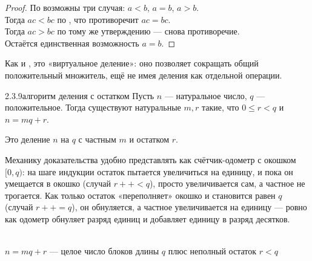 \begin{proof}
По  возможны три случая: $a<b$, $a=b$, $a>b$.\\
 Тогда $ac<bc$ по , что противоречит
$ac=bc$.\\
 Тогда $ac>bc$ по тому же утверждению — снова противоречие.\\
Остаётся единственная возможность $a=b$.
\end{proof}

\begin{remark}
Как и , это «виртуальное деление»: оно
позволяет сокращать общий положительный множитель, ещё не имея деления как отдельной
операции.
\end{remark}

\begin{proposition}{2.3.9}{алгоритм деления с остатком}
Пусть $n$ — натуральное число, $q$ — положительное. Тогда существуют натуральные $m,r$
такие, что $0 \leq r < q$ и $n=mq+r$.
\end{proposition}

\begin{remark}
Это деление $n$ на $q$ с частным $m$ и остатком $r$.
\end{remark}

\begin{intuition}
Механику доказательства удобно представлять как счётчик-одометр с окошком $[0,q)$: на шаге
индукции остаток пытается увеличиться на единицу, и пока он умещается в окошко (случай
$r{+}{+}<q$), просто увеличивается сам, а частное не трогается. Как только остаток
«переполняет» окошко и становится равен $q$ (случай $r{+}{+}=q$), он обнуляется, а частное
увеличивается на единицу — ровно как одометр обнуляет разряд единиц и добавляет единицу в
разряд десятков.

\begin{center}
\\
{\footnotesize\color{intuitiongray}$n=mq+r$ — целое число блоков длины $q$ плюс неполный
остаток $r<q$}
\end{center}
\end{intuition}

